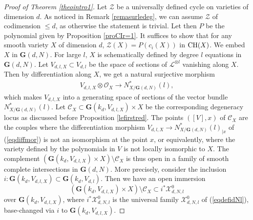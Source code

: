 \documentclass[10pt]{article}
\begin{document}
\begin{proof}[Proof of Theorem \ref{theointro1}] Let $\mathcal{Z}$ be a universally defined cycle
on   varieties of dimension $d$. As noticed in Remark \ref{remasurledeg}, we can assume
 $\mathcal{Z}$ of  codimension  $\leq d$, as otherwise the statement is trivial. Let then
$P$ be the polynomial given by Proposition \ref{proCIr=1}. It suffices to show that for
 any smooth variety $X$ of  dimension $d$, $\mathcal{Z}(X)=P(c_i(X))$ in ${\rm CH}(X)$.
 We embed $X$ in $\mathbf{G}(d,N)$. For large $l$, $X$ is schematically defined by degree $l$ equations in
 $\mathbf{G}(d,N)$. Let
 $V_{d,l,X}\subset V_{d,l}$ be the space of sections of $\mathcal{L}^{\otimes l}$ vanishing along $X$.
 Then by differentiation along $X$, we get a natural surjective morphism
 \begin{eqnarray}
 \label{eqdiffmor} V_{d,l,X}\otimes\mathcal{O}_X\rightarrow N_{X/\mathbf{G}(d,N)}^*(l),
 \end{eqnarray}
 which makes $V_{d,l,X}$ into a generating space of sections of the vector bundle $ N_{X/\mathbf{G}(d,N)}^*(l)$.
 Let $\mathcal{C}_{X}\subset \mathbf{G}(k_{d}, V_{d,l,X})\times X$ be the corresponding degeneracy locus as discussed before Proposition \ref{lefirstred}.
 The points $([V],x)$ of $\mathcal{C}_{X}$ are the couples where the differentiation
 morphism
 $V_{d,l,X}\rightarrow N_{X/\mathbf{G}(d,N)}^*(l)_{|x}$ of  (\ref{eqdiffmor})  is not an isomorphism  at the point $x$, or equivalently, where the variety defined by the polynomials in $V$ is not locally isomorphic
 to $X$.
 The complement
 $(\mathbf{G}(k_{d}, V_{d,l,X})\times X)\setminus \mathcal{C}_{X}$ is thus open in a family of smooth complete intersections
 in $\mathbf{G}(d,N)$. More precisely,
 consider the inclusion
 $i:\mathbf{G}(k_{d}, V_{d,l,X})\subset \mathbf{G}(k_{d},V_{d,l})$. Then we have an open immersion
 $$(\mathbf{G}(k_{d}, V_{d,l,X})\times X)\setminus \mathcal{C}_{X}\subset i^*\mathcal{X}^0_{d,N,l}$$
 over $\mathbf{G}(k_{d}, V_{d,l,X})$,
 where $i^*\mathcal{X}^0_{d,N,l}$ is the universal family $\mathcal{X}^0_{d,N,l}$ of (\ref{eqdefidNl}), base-changed
 via $i$ to
 $\mathbf{G}(k_{d}, V_{d,l,X})$.


\end{proof}
\end{document}
